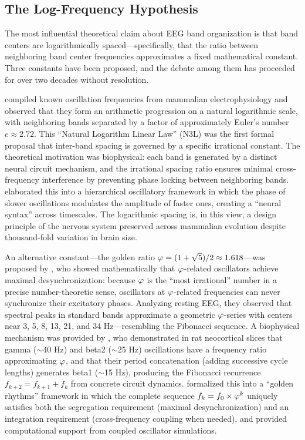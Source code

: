 \subsection{The Log-Frequency Hypothesis}

The most influential theoretical claim about EEG band organization is that band centers are logarithmically spaced---specifically, that the ratio between neighboring band center frequencies approximates a fixed mathematical constant. Three constants have been proposed, and the debate among them has proceeded for over two decades without resolution.

\textcite{penttonen2003natural} compiled known oscillation frequencies from mammalian electrophysiology and observed that they form an arithmetic progression on a natural logarithmic scale, with neighboring bands separated by a factor of approximately Euler's number $e \approx 2.72$. This ``Natural Logarithm Linear Law'' (N3L) was the first formal proposal that inter-band spacing is governed by a specific irrational constant. The theoretical motivation was biophysical: each band is generated by a distinct neural circuit mechanism, and the irrational spacing ratio ensures minimal cross-frequency interference by preventing phase locking between neighboring bands. \textcite{buzsaki2004neuronal,buzsaki2006rhythms,buzsaki2013scaling} elaborated this into a hierarchical oscillatory framework in which the phase of slower oscillations modulates the amplitude of faster ones, creating a ``neural syntax'' across timescales. The logarithmic spacing is, in this view, a design principle of the nervous system preserved across mammalian evolution despite thousand-fold variation in brain size.

An alternative constant---the golden ratio $\varphi = (1 + \sqrt{5})/2 \approx 1.618$---was proposed by \textcite{pletzer2010golden}, who showed mathematically that $\varphi$-related oscillators achieve maximal desynchronization: because $\varphi$ is the ``most irrational'' number in a precise number-theoretic sense, oscillators at $\varphi$-related frequencies can never synchronize their excitatory phases. Analyzing resting EEG, they observed that spectral peaks in standard bands approximate a geometric $\varphi$-series with centers near 3, 5, 8, 13, 21, and 34 Hz---resembling the Fibonacci sequence. A biophysical mechanism was provided by \textcite{roopun2008period}, who demonstrated in rat neocortical slices that gamma ($\sim$40 Hz) and beta2 ($\sim$25 Hz) oscillations have a frequency ratio approximating $\varphi$, and that their period concatenation (adding successive cycle lengths) generates beta1 ($\sim$15 Hz), producing the Fibonacci recurrence $f_{k+2} = f_{k+1} + f_k$ from concrete circuit dynamics. \textcite{kramer2023golden} formalized this into a ``golden rhythms'' framework in which the complete sequence $f_k = f_0 \times \varphi^k$ uniquely satisfies both the segregation requirement (maximal desynchronization) and an integration requirement (cross-frequency coupling when needed), and provided computational support from coupled oscillator simulations.

